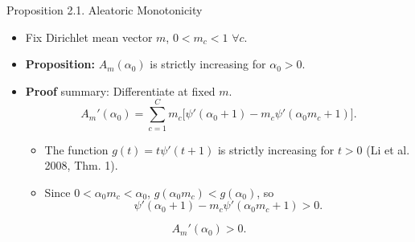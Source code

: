 \begin{frame}{Proposition 2.1. Aleatoric Monotonicity}
\label{frm:backup-aleatoric-monotonicity}
\begin{itemize}
\setlength{\itemsep}{5mm}
\item Fix Dirichlet mean vector $m$, $0<m_c<1$ $\forall c$.
\item \textbf{Proposition:} $A_m(\alpha_0)$ is strictly increasing for $\alpha_0>0$.
\item \textbf{Proof} summary: Differentiate at fixed $m$.
\[
A_m'(\alpha_0)
=\sum_{c=1}^{C}m_c
\bigl[\psi'(\alpha_0+1)-m_c\psi'(\alpha_0m_c+1)\bigr].
\]
\begin{itemize}
\item The function $g(t)=t\psi'(t+1)$ is strictly increasing for $t>0$ 
(Li et al. 2008, Thm. 1).
\item Since $0<\alpha_0m_c<\alpha_0$, $g(\alpha_0m_c)<g(\alpha_0)$, so
\[
\psi'(\alpha_0+1)-m_c\psi'(\alpha_0m_c+1)>0.
\]
\end{itemize}
\end{itemize}
\[
A_m'(\alpha_0)>0.
\]
\end{frame}

